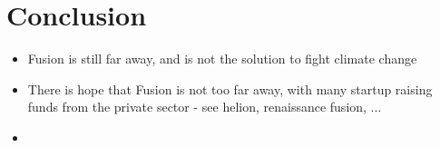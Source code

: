 \cleardoublepage
\chapter*{Conclusion}


\begin{itemize}
    \item Fusion is still far away, and is not the solution to fight climate change
    \item There is hope that Fusion is not too far away, with many startup raising funds from the private sector - see helion, renaissance fusion, ...
    \item 
\end{itemize}